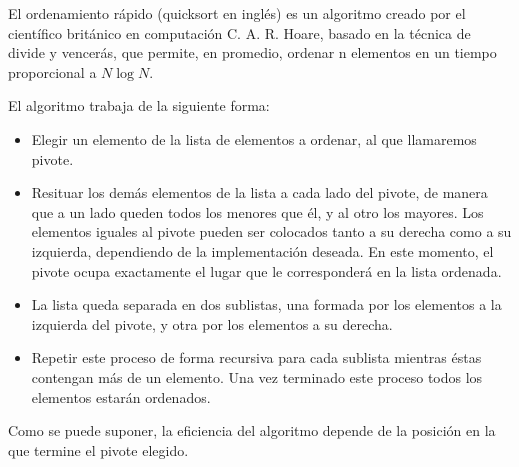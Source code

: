 El ordenamiento rápido (quicksort en inglés) es un algoritmo creado por el científico británico en computación C. A. R. Hoare, basado en la técnica de divide y vencerás, que permite, en promedio, ordenar n elementos en un tiempo proporcional a $N \log N$.

El algoritmo trabaja de la siguiente forma:
\begin{itemize}
	\item Elegir un elemento de la lista de elementos a ordenar, al que llamaremos pivote. 
	\item Resituar los demás elementos de la lista a cada lado del pivote, de manera que a un lado queden todos los menores que él, y al otro los mayores. Los elementos iguales al pivote pueden ser colocados tanto a su derecha como a su izquierda, dependiendo de la implementación deseada. En este momento, el pivote ocupa exactamente el lugar que le corresponderá en la lista ordenada.
	\item La lista queda separada en dos sublistas, una formada por los elementos a la izquierda del pivote, y otra por los elementos a su derecha. 
	\item Repetir este proceso de forma recursiva para cada sublista mientras éstas contengan más de un elemento. Una vez terminado este proceso todos los elementos estarán ordenados. 
\end{itemize}

Como se puede suponer, la eficiencia del algoritmo depende de la posición en la que termine el pivote elegido.

